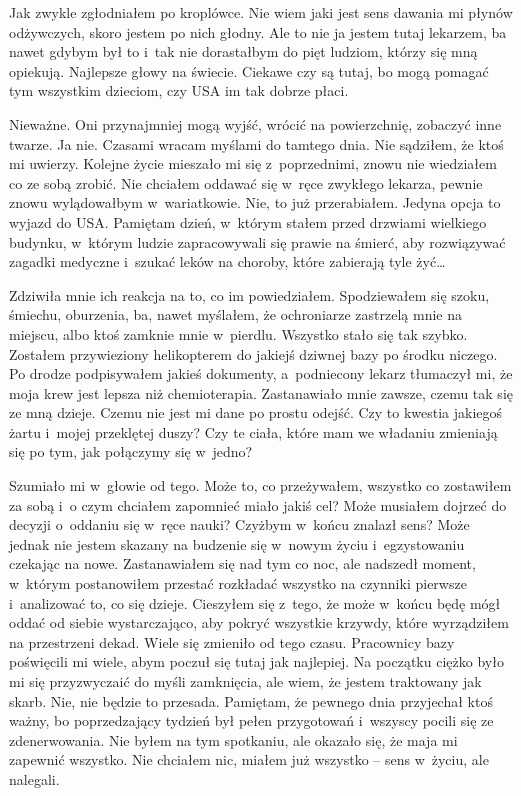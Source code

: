 Jak zwykle zgłodniałem po kroplówce. Nie wiem jaki jest sens dawania mi płynów odżywczych, skoro jestem po nich głodny. Ale to nie ja jestem tutaj lekarzem, ba nawet gdybym był to i~tak nie dorastałbym do pięt ludziom, którzy się mną opiekują. Najlepsze głowy na świecie. Ciekawe czy są tutaj, bo mogą pomagać tym wszystkim dzieciom, czy USA im tak dobrze płaci. 

Nieważne. Oni przynajmniej mogą wyjść, wrócić na powierzchnię, zobaczyć inne twarze. Ja nie. Czasami wracam myślami do tamtego dnia. Nie sądziłem, że ktoś mi uwierzy. Kolejne życie mieszało mi się z~poprzednimi, znowu nie wiedziałem co ze sobą zrobić. Nie chciałem oddawać się w~ręce zwykłego lekarza, pewnie znowu wylądowałbym w~wariatkowie. Nie, to już przerabiałem. Jedyna opcja to wyjazd do USA. Pamiętam dzień, w~którym stałem przed drzwiami wielkiego budynku, w~którym ludzie zapracowywali się prawie na śmierć, aby rozwiązywać zagadki medyczne i~szukać leków na choroby, które zabierają tyle żyć…

Zdziwiła mnie ich reakcja na to, co im powiedziałem. Spodziewałem się szoku, śmiechu, oburzenia, ba, nawet myślałem, że ochroniarze zastrzelą mnie na miejscu, albo ktoś zamknie mnie w~pierdlu. Wszystko stało się tak szybko. Zostałem przywieziony helikopterem do jakiejś dziwnej bazy po środku niczego. Po drodze podpisywałem jakieś dokumenty, a~podniecony lekarz tłumaczył mi, że moja krew jest lepsza niż chemioterapia. Zastanawiało mnie zawsze, czemu tak się ze mną dzieje. Czemu nie jest mi dane po prostu odejść. Czy to kwestia jakiegoś żartu i~mojej przeklętej duszy? Czy te ciała, które mam we władaniu zmieniają się po tym, jak połączymy się w~jedno? 

Szumiało mi w~głowie od tego. Może to, co przeżywałem, wszystko co zostawiłem za sobą i~o czym chciałem zapomnieć miało jakiś cel? Może musiałem dojrzeć do decyzji o~oddaniu się w~ręce nauki? Czyżbym w~końcu znalazł sens? Może jednak nie jestem skazany na budzenie się w~nowym życiu i~egzystowaniu czekając na nowe. Zastanawiałem się nad tym co noc, ale nadszedł moment, w~którym postanowiłem przestać rozkładać wszystko na czynniki pierwsze i~analizować to, co się dzieje. Cieszyłem się z~tego, że może w~końcu będę mógł oddać od siebie wystarczająco, aby pokryć wszystkie krzywdy, które wyrządziłem na przestrzeni dekad. Wiele się zmieniło od tego czasu. Pracownicy bazy poświęcili mi wiele, abym poczuł się tutaj jak najlepiej. Na początku ciężko było mi się przyzwyczaić do myśli zamknięcia, ale wiem, że jestem traktowany jak skarb. Nie, nie będzie to przesada. Pamiętam, że pewnego dnia przyjechał ktoś ważny, bo poprzedzający tydzień był pełen przygotowań i~wszyscy pocili się ze zdenerwowania. Nie byłem na tym spotkaniu, ale okazało się, że maja mi zapewnić wszystko. Nie chciałem nic, miałem już wszystko -- sens w~życiu, ale nalegali.

